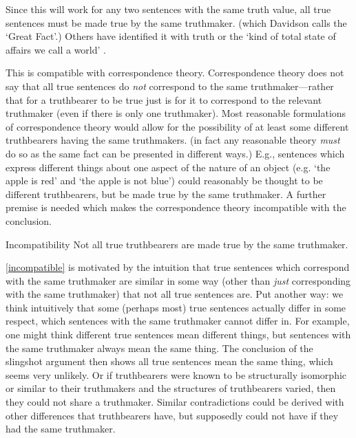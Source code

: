Since this will work for any two sentences with the same truth value, all true sentences must be made true by the same truthmaker. (which Davidson calls the `Great Fact'.)
\parencite[753]{Davidson_1969}
Others have identified it with truth \parencite[216]{Frege_1948} or the `kind of total state of affairs we call a world' \parencite[242]{Lewis1943-LEWTMO}.

This is compatible with correspondence theory.
Correspondence theory does not say that all true sentences do \emph{not} correspond to the same truthmaker---rather that for a truthbearer to be true just is for it to correspond to the relevant truthmaker (even if there is only one truthmaker).
Most reasonable formulations of correspondence theory would allow for the possibility of at least some different truthbearers having the same truthmakers.
(in fact any reasonable theory \emph{must} do so as the same fact can be presented in different ways.) %
E.g., sentences which express different things about one aspect of the nature of an object (e.g. `the apple is red' and `the apple is not blue')	could reasonably be thought to be different truthbearers, but be made true by the same truthmaker.
A further premise is needed which makes the correspondence theory incompatible with the conclusion.

	\begin{principle}{Incompatibility}\label{incompatible}
	Not all true truthbearers are made true by the same truthmaker.
	\end{principle}

\ref{incompatible} is motivated by the intuition that true sentences which correspond with the same truthmaker are similar in some way (other than \emph{just} corresponding with the same truthmaker) that not all true sentences are.
Put another way: we think intuitively that some (perhaps most) true sentences actually differ in some respect, which sentences with the same truthmaker cannot differ in.
For example, one might think different true sentences mean different things, but sentences with the same truthmaker always mean the same thing.
The conclusion of the slingshot argument then shows all true sentences mean the same thing, which seems very unlikely.
Or if truthbearers were known to be structurally isomorphic or similar to their truthmakers and the structures of truthbearers varied, then they could not share a truthmaker.
Similar contradictions could be derived with other differences that truthbearers have, but supposedly could not have if they had the same truthmaker.

